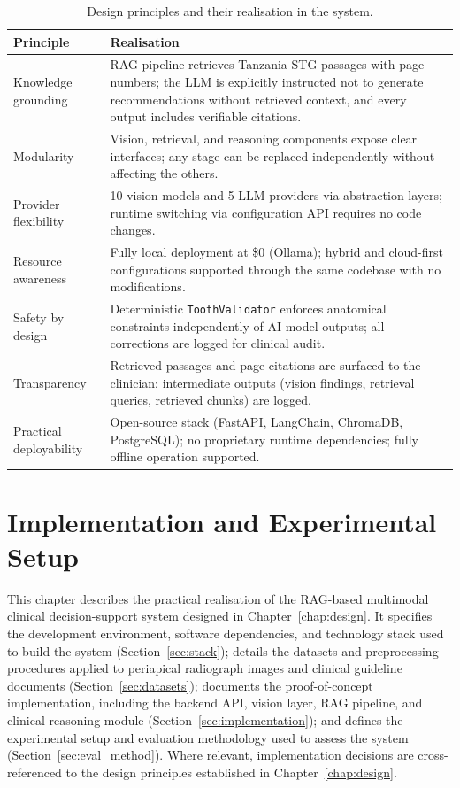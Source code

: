 \documentclass[12pt,a4paper]{report}
\begin{document}
	\begin{table}[H]
		\centering
		\caption{Design principles and their realisation in the system.}
		\label{tab:principles}
		{\small
			\begin{tabular}{p{3.0cm}p{9.5cm}}
				\toprule
				\textbf{Principle} & \textbf{Realisation} \\
				\midrule
				Knowledge grounding
				& RAG pipeline retrieves Tanzania STG passages with page numbers; the LLM is explicitly
				instructed not to generate recommendations without retrieved context, and every output
				includes verifiable citations. \\[4pt]
				Modularity
				& Vision, retrieval, and reasoning components expose clear interfaces; any stage can be
				replaced independently without affecting the others. \\[4pt]
				Provider flexibility
				& 10 vision models and 5 LLM providers via abstraction layers; runtime switching via
				configuration API requires no code changes. \\[4pt]
				Resource awareness
				& Fully local deployment at \$0 (Ollama); hybrid and cloud-first configurations
				supported through the same codebase with no modifications. \\[4pt]
				Safety by design
				& Deterministic \texttt{ToothValidator} enforces anatomical constraints independently of
				AI model outputs; all corrections are logged for clinical audit. \\[4pt]
				Transparency
				& Retrieved passages and page citations are surfaced to the clinician; intermediate
				outputs (vision findings, retrieval queries, retrieved chunks) are logged. \\[4pt]
				Practical deployability
				& Open-source stack (FastAPI, LangChain, ChromaDB, PostgreSQL); no proprietary runtime
				dependencies; fully offline operation supported. \\
				\bottomrule
			\end{tabular}
		}
	\end{table}



\chapter{Implementation and Experimental Setup}
\label{chap:implementation}

This chapter describes the practical realisation of the RAG-based
multimodal clinical decision-support system designed in Chapter~\ref{chap:design}.
It specifies the development environment, software dependencies, and
technology stack used to build the system (Section~\ref{sec:stack});
details the datasets and preprocessing procedures applied to periapical
radiograph images and clinical guideline documents
(Section~\ref{sec:datasets}); documents the proof-of-concept
implementation, including the backend API, vision layer, RAG pipeline,
and clinical reasoning module (Section~\ref{sec:implementation}); and
defines the experimental setup and evaluation methodology used to assess
the system (Section~\ref{sec:eval_method}).  Where relevant,
implementation decisions are cross-referenced to the design principles
established in Chapter~\ref{chap:design}.
\end{document}
